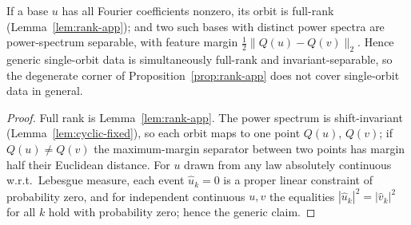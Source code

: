 \begin{proposition}\label{prop:generic-app}
If a base $u$ has all Fourier coefficients nonzero, its orbit is full-rank
(Lemma~\ref{lem:rank-app}); and two such bases with distinct power spectra are
power-spectrum separable, with feature margin $\tfrac12\lVert Q(u)-Q(v)\rVert_2$.
Hence generic single-orbit data is simultaneously full-rank and
invariant-separable, so the degenerate corner of Proposition~\ref{prop:rank-app}
does not cover single-orbit data in general.
\end{proposition}
\begin{proof}
Full rank is Lemma~\ref{lem:rank-app}. The power spectrum is shift-invariant
(Lemma~\ref{lem:cyclic-fixed}), so each orbit maps to one point $Q(u)$, $Q(v)$;
if $Q(u)\neq Q(v)$ the maximum-margin separator between two points has margin
half their Euclidean distance. For $u$ drawn from any law absolutely continuous
w.r.t.\ Lebesgue measure, each event $\hat u_k=0$ is a proper linear constraint
of probability zero, and for independent continuous $u,v$ the equalities
$|\hat u_k|^2=|\hat v_k|^2$ for all $k$ hold with probability zero; hence the
generic claim.
\end{proof}

